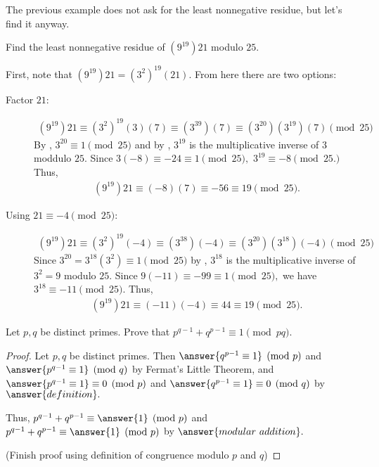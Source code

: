 \documentclass{ximera}
\begin{document}
The previous example does not ask for the least nonnegative residue, but let's find it anyway.

\begin{example}
  Find the least nonnegative residue of $(9^{19})21$ modulo $25$.

  First, note that $(9^{19})21=(3^2)^19(21)$. From here there are two options:

  \begin{description}
    \item[Factor $21$:]
      \begin{align*}
        (9^{19})21\equiv (3^2)^19(3)(7)
        \equiv (3^{39})(7)
        \equiv (3^{20})(3^{19})(7) \pmod{25}
      \end{align*}
      By , $3^{20}\equiv 1\pmod{25}$ and by , $3^{19}$ is the multiplicative inverse of $3$ moddulo $25.$ Since $3(-8)\equiv -24\equiv 1\pmod{25},$ $3^{19}\equiv -8\pmod{25.}$ Thus, 
      \begin{align*}
        (9^{19})21\equiv (-8)(7)\equiv -56\equiv 19 \pmod{25}.
      \end{align*}

    \item[Using $21\equiv -4\pmod{25}$:] 
      \begin{align*}
        (9^{19})21\equiv (3^2)^19(-4)
        \equiv (3^{38})(-4)
        \equiv (3^{20})(3^{18})(-4) \pmod{25}
      \end{align*}
      Since $3^{20}=3^{18}(3^2)\equiv 1\pmod{25}$ by , $3^{18}$ is the multiplicative inverse of $3^2=9$ modulo $25.$ Since $9(-11)\equiv -99\equiv 1\pmod{25},$ we have $3^{18}\equiv -11\pmod{25}.$ Thus, 
      \begin{align*}
        (9^{19})21\equiv (-11)(-4)\equiv 44 \equiv 19 \pmod{25}.
      \end{align*}
  \end{description}
  
\end{example}

\begin{br}\label{br:modpq}
  Let $p,q$ be distinct primes. Prove that $p^{q-1}+q^{p-1}\equiv 1 \pmod{pq}.$
 
 
  \begin{proof} Let $p,q$ be distinct primes. 
   Then $\answer{q^{p-1}\equiv 1}\pmod{p}$ and  $\answer{p^{q-1}\equiv 1}\pmod{q}$ by Fermat's Little Theorem, and $\answer{p^{q-1}\equiv 1}\equiv0\pmod{p}$ and  $\answer{q^{p-1}\equiv 1}\equiv 0\pmod{q}$ by $\answer{definition}.$
   
   Thus, $p^{q-1}+q^{p-1}\equiv \answer{1} \pmod{p}$ and $p^{q-1}+q^{p-1}\equiv \answer{1} \pmod{p}$ by $\answer{modular\ addition}.$

   (Finish proof using definition of congruence modulo $p$ and $q$)
  \end{proof}
\end{br}

\end{document}
